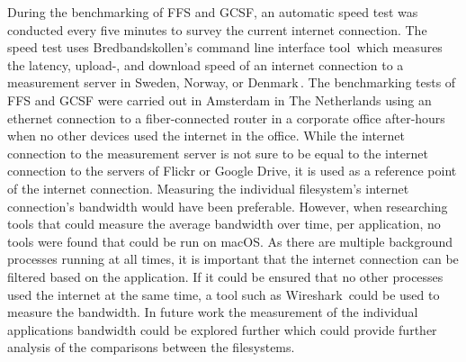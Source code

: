 During the benchmarking of \gls{FFS} and \gls{GCSF}, an automatic speed test was conducted every five minutes to survey the current internet connection. The speed test uses Bredbandskollen's command line interface tool\,\cite{internetstiftelsenBredbandskollenCLIBredbandskollen} which measures the latency, upload-, and download speed of an internet connection to a measurement server in Sweden, Norway, or Denmark\,\cite{internetstiftelsenMerOmBredbandskollen}. The benchmarking tests of \gls{FFS} and \gls{GCSF} were carried out in Amsterdam in The Netherlands using an ethernet connection to a \mbox{fiber-connected} router in a corporate office after-hours when no other devices used the internet in the office. While the internet connection to the measurement server is not sure to be equal to the internet connection to the servers of Flickr or Google Drive, it is used as a reference point of the internet connection. Measuring the individual filesystem's internet connection's bandwidth would have been preferable. However, when researching tools that could measure the average bandwidth over time, per application, no tools were found that could be run on macOS. As there are multiple background processes running at all times, it is important that the internet connection can be filtered based on the application. If it could be ensured that no other processes used the internet at the same time, a tool such as Wireshark\,\cite{WiresharkGoDeep} could be used to measure the bandwidth. In future work the measurement of the individual applications bandwidth could be explored further which could provide further analysis of the comparisons between the filesystems.